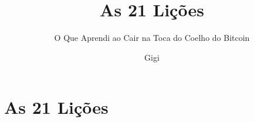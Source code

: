 \documentclass[paper=6in:9in,pagesize=pdftex,
               headinclude=on,footinclude=on,12pt]{scrbook}
\begin{document}
\frontmatter

\title{As 21 Lições}
\subtitle{O Que Aprendi ao Cair na Toca do Coelho do Bitcoin}
\author{Gigi}
\date{}

\maketitle

\cleardoublepage




\tableofcontents



\mainmatter

\part*{As 21 Lições}




























\cleardoublepage



\listoffigures



\end{document}
